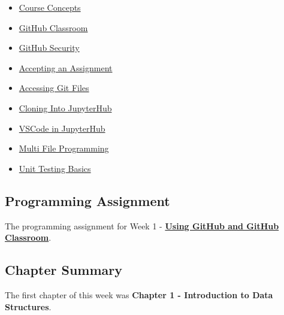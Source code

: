 \begin{itemize}
    \item \href{https://www.youtube.com/watch?v=l3e6UsF1RdQ}{Course Concepts}
    \item \href{https://www.youtube.com/watch?v=hu81oFq0nA8}{GitHub Classroom}
    \item \href{https://www.youtube.com/watch?v=7_x86HeoglQ&t=178s}{GitHub Security}
    \item \href{https://www.youtube.com/watch?v=b0Ystl84XYY}{Accepting an Assignment}
    \item \href{https://applied.cs.colorado.edu/mod/page/view.php?id=45856}{Accessing Git Files}
    \item \href{https://www.youtube.com/watch?v=M293X5ssks4}{Cloning Into JupyterHub}
    \item \href{https://www.youtube.com/watch?v=dptdfci_Zn0}{VSCode in JupyterHub}
    \item \href{https://www.youtube.com/watch?v=jchWSvAdadE}{Multi File Programming}
    \item \href{https://www.youtube.com/watch?v=tsVh8mG2tM0}{Unit Testing Basics}
\end{itemize}

\subsection{Programming Assignment}

The programming assignment for Week 1 - \href{https://github.com/cu-cspb-2270-Summer-2023/pa0-RelativiBit}{\textbf{Using GitHub and GitHub Classroom}}.

\subsection{Chapter Summary}

The first chapter of this week was \textbf{Chapter 1 - Introduction to Data Structures}.

